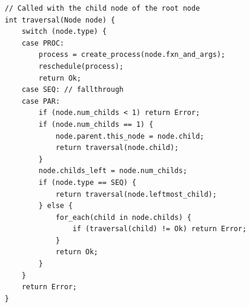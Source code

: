 
\begin{lstlisting}[style=CustomC,caption={Pseudo code for the composite process tree traversal algorithm},label={lst:algo_composite_process_tree_traversal}]
// Called with the child node of the root node
int traversal(Node node) {
	switch (node.type) {
	case PROC:
		process = create_process(node.fxn_and_args);
		reschedule(process);
		return Ok;
	case SEQ: // fallthrough
	case PAR:
	    if (node.num_childs < 1) return Error;
	    if (node.num_childs == 1) {
	        node.parent.this_node = node.child;
	        return traversal(node.child);
	    }
		node.childs_left = node.num_childs;
		if (node.type == SEQ) {
			return traversal(node.leftmost_child);
		} else {
		    for_each(child in node.childs) {
		    	if (traversal(child) != Ok) return Error;
		    }
		    return Ok;
		}
	}
	return Error;
}
\end{lstlisting}

